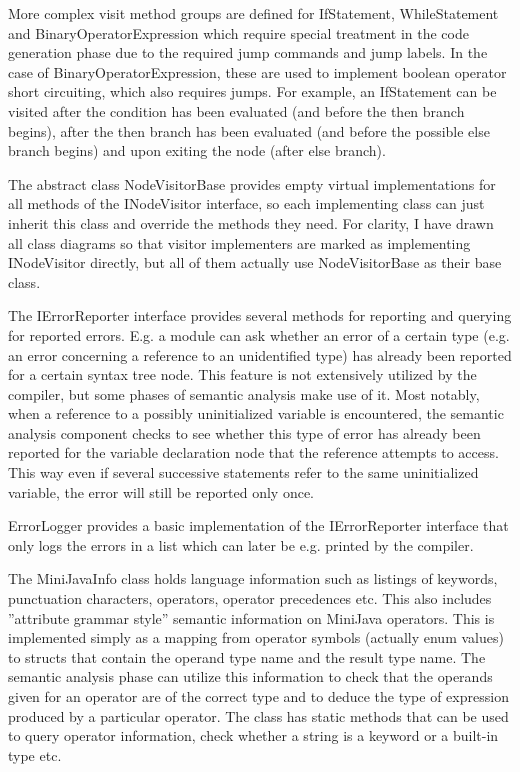 \documentclass[a4paper,11pt]{article}
\begin{document}
More complex visit method groups are defined for IfStatement, WhileStatement and BinaryOperatorExpression which require special treatment in the code generation phase due to the required jump commands and jump labels. In the case of BinaryOperatorExpression, these are used to implement boolean operator short circuiting, which also requires jumps. For example, an IfStatement can be visited after the condition has been evaluated (and before the then branch begins), after the then branch has been evaluated (and before the possible else branch begins) and upon exiting the node (after else branch).

The abstract class NodeVisitorBase provides empty virtual implementations for all methods of the INodeVisitor interface, so each implementing class can just inherit this class and override the methods they need. For clarity, I have drawn all class diagrams so that visitor implementers are marked as implementing INodeVisitor directly, but all of them actually use NodeVisitorBase as their base class.

The IErrorReporter interface provides several methods for reporting and querying for reported errors. E.g. a module can ask whether an error of a certain type (e.g. an error concerning a reference to an unidentified type) has already been reported for a certain syntax tree node. This feature is not extensively utilized by the compiler, but some phases of semantic analysis make use of it. Most notably, when a reference to a possibly uninitialized variable is encountered, the semantic analysis component checks to see whether this type of error has already been reported for the variable declaration node that the reference attempts to access. This way even if several successive statements refer to the same uninitialized variable, the error will still be reported only once.

ErrorLogger provides a basic implementation of the IErrorReporter interface that only logs the errors in a list which can later be e.g. printed by the compiler.

The MiniJavaInfo class holds language information such as listings of keywords, punctuation characters, operators, operator precedences etc. This also includes ''attribute grammar style'' semantic information on MiniJava operators. This is implemented simply as a mapping from operator symbols (actually enum values) to structs that contain the operand type name and the result type name. The semantic analysis phase can utilize this information to check that the operands given for an operator are of the correct type and to deduce the type of expression produced by a particular operator. The class has static methods that can be used to query operator information, check whether a string is a keyword or a built-in type etc.
\end{document}
